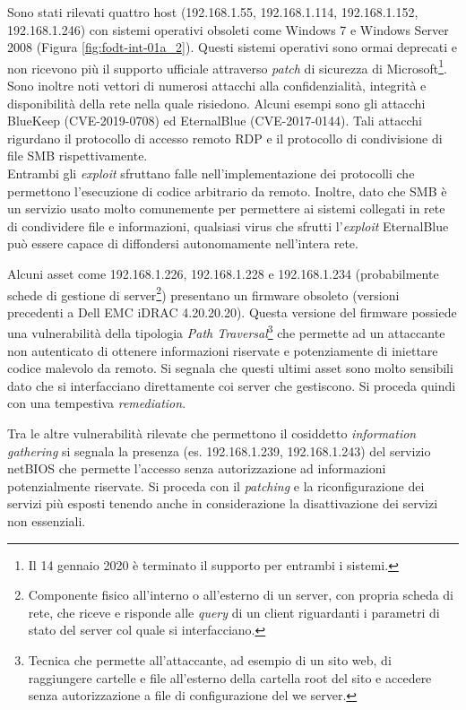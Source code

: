 \documentclass[target=bach,aauheader=]{thud}
\begin{document}
Sono stati rilevati quattro host (192.168.1.55, 192.168.1.114, 192.168.1.152, 192.168.1.246) con sistemi operativi obsoleti come Windows 7 e Windows Server 2008  (Figura \ref{fig:fodt-int-01a_2}). Questi sistemi operativi sono ormai deprecati e non ricevono più il supporto ufficiale attraverso \textit{patch} di sicurezza di Microsoft\footnote{Il 14 gennaio 2020 è terminato il supporto per entrambi i sistemi.}. Sono inoltre noti vettori di numerosi attacchi alla confidenzialità, integrità e disponibilità della rete nella quale risiedono. Alcuni esempi sono gli attacchi BlueKeep (CVE-2019-0708) ed EternalBlue (CVE-2017-0144). Tali attacchi rigurdano il protocollo di accesso remoto RDP e il protocollo di condivisione di file SMB rispettivamente.
\\ Entrambi gli \textit{exploit} sfruttano falle nell'implementazione dei protocolli che permettono l'esecuzione di codice arbitrario da remoto. Inoltre, dato che SMB è un servizio usato molto comunemente per permettere ai sistemi collegati in rete di condividere file e informazioni, qualsiasi virus che sfrutti l'\textit{exploit} EternalBlue può essere capace di diffondersi autonomamente nell'intera rete.  

Alcuni asset come 192.168.1.226, 192.168.1.228 e 192.168.1.234 (probabilmente schede di gestione di server\footnote{Componente fisico all'interno o all'esterno di un server, con propria scheda di rete, che riceve e risponde alle \textit{query} di un client riguardanti i parametri di stato del server col quale si interfacciano.}) presentano un firmware obsoleto (versioni precedenti a Dell EMC iDRAC 4.20.20.20). Questa versione del firmware possiede una vulnerabilità della tipologia \textit{Path Traversal}\footnote{Tecnica che permette all'attaccante, ad esempio di un sito web, di raggiungere cartelle e file all'esterno della cartella root del sito e accedere senza autorizzazione a file di configurazione del we server.} che permette ad un attaccante non autenticato di ottenere informazioni riservate e potenziamente di iniettare codice malevolo da remoto.
Si segnala che questi ultimi asset sono molto sensibili dato che si interfacciano direttamente coi server che gestiscono. Si proceda quindi con una tempestiva \textit{remediation}.

Tra le altre vulnerabilità rilevate che permettono il cosiddetto \textit{information gathering} si segnala la presenza (es. 192.168.1.239, 192.168.1.243) del servizio netBIOS che permette l’accesso senza autorizzazione ad informazioni potenzialmente riservate.
Si proceda con il \textit{patching} e la riconfigurazione dei servizi più esposti tenendo anche in considerazione la disattivazione dei servizi non essenziali.
\end{document}
